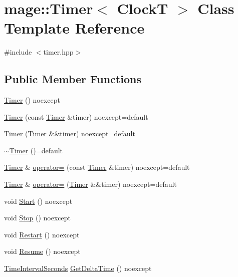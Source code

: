 \hypertarget{classmage_1_1_timer}{}\section{mage\+:\+:Timer$<$ ClockT $>$ Class Template Reference}
\label{classmage_1_1_timer}


{\ttfamily \#include $<$timer.\+hpp$>$}

\subsection*{Public Member Functions}
\begin{DoxyCompactItemize}
\item 
\mbox{\hyperlink{classmage_1_1_timer_afdc4024388d57bbdda74854ee8a11683}{Timer}} () noexcept
\item 
\mbox{\hyperlink{classmage_1_1_timer_a69aa4becb39ab40f378bd110db8ceb84}{Timer}} (const \mbox{\hyperlink{classmage_1_1_timer}{Timer}} \&timer) noexcept=default
\item 
\mbox{\hyperlink{classmage_1_1_timer_a7fb565cbe34c04df2713c43d3341cbc4}{Timer}} (\mbox{\hyperlink{classmage_1_1_timer}{Timer}} \&\&timer) noexcept=default
\item 
\mbox{\hyperlink{classmage_1_1_timer_a2802ae35dfdc05ff57b49e82f9b504f2}{$\sim$\+Timer}} ()=default
\item 
\mbox{\hyperlink{classmage_1_1_timer}{Timer}} \& \mbox{\hyperlink{classmage_1_1_timer_a2a8aefb272e02d8ba4a26058df80f119}{operator=}} (const \mbox{\hyperlink{classmage_1_1_timer}{Timer}} \&timer) noexcept=default
\item 
\mbox{\hyperlink{classmage_1_1_timer}{Timer}} \& \mbox{\hyperlink{classmage_1_1_timer_a39654f81efccc38a4cbe6164659407dd}{operator=}} (\mbox{\hyperlink{classmage_1_1_timer}{Timer}} \&\&timer) noexcept=default
\item 
void \mbox{\hyperlink{classmage_1_1_timer_a633908e9e816e9397cd93b65bc11ddb3}{Start}} () noexcept
\item 
void \mbox{\hyperlink{classmage_1_1_timer_ab9442d64c2c1bedec830004f292725ab}{Stop}} () noexcept
\item 
void \mbox{\hyperlink{classmage_1_1_timer_a54dab2d77f8beca30d52e8497e466988}{Restart}} () noexcept
\item 
void \mbox{\hyperlink{classmage_1_1_timer_a8464b2ea3fb3d97eac5ccb3a5b02e47b}{Resume}} () noexcept
\item 
\mbox{\hyperlink{namespacemage_a21c3d1575018d1e0720948713c76be1f}{Time\+Interval\+Seconds}} \mbox{\hyperlink{classmage_1_1_timer_a6e4625cf76496069e77b452345cefd0b}{Get\+Delta\+Time}} () noexcept

\end{DoxyCompactItemize}
